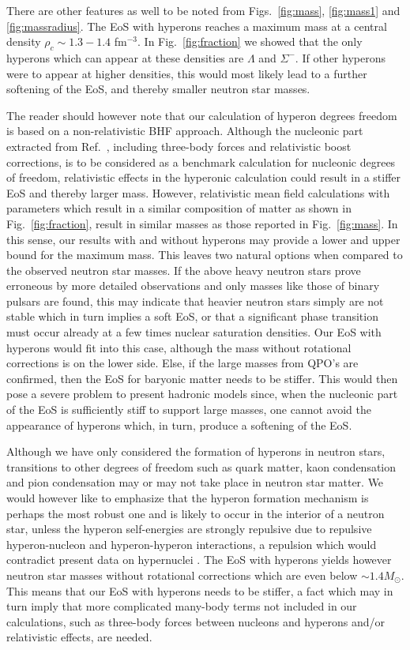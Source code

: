 There are other features as well to be noted from Figs.\ \ref{fig:mass},
\ref{fig:mass1} and \ref{fig:massradius}.
The EoS with hyperons reaches a maximum mass at a central density 
$\rho_c\sim 1.3-1.4$ fm$^{-3}$. In Fig.\ \ref{fig:fraction} 
we showed that the only hyperons which can appear at these densities
are $\Lambda$ and $\Sigma^-$.
If other hyperons were to appear at higher
densities, this would most likely lead to a further softening of the EoS, and 
thereby smaller neutron star masses. 

The reader should however note that our calculation of hyperon
degrees freedom is based on a non-relativistic BHF 
approach. Although the nucleonic part extracted from Ref.\ \cite{apr98},
including three-body forces and relativistic boost corrections, is to be 
considered as a benchmark calculation for nucleonic degrees of freedom,
relativistic effects in the hyperonic calculation could result in a
stiffer EoS and thereby larger mass. However, relativistic mean 
field calculations
with parameters which result in a similar composition of matter as
shown in Fig.\ \ref{fig:fraction}, result in similar masses
as  those reported in Fig.\ \ref{fig:mass}.
In this sense, our results with and without hyperons 
may provide a lower and upper bound for the 
maximum mass. This  leaves two natural options
when compared to the observed neutron star masses.
If the above heavy neutron stars prove erroneous 
by more detailed observations
and only masses like those of binary pulsars are found, 
this may indicate that heavier neutron stars simply are not
stable which in turn implies a soft EoS, or that a
significant phase transition must occur already at a few times nuclear
saturation densities. Our EoS with hyperons would fit into this case, although
the mass without rotational corrections is on the lower side.
Else, if the large masses from QPO's are confirmed, then the EoS
for baryonic matter needs to be stiffer. This would then pose a severe
problem to present hadronic models since, when the nucleonic part of the
EoS is 
sufficiently stiff to support large masses, one cannot avoid the
appearance of hyperons which, in turn, produce a softening of the EoS.

Although we have only considered the formation of hyperons in neutron
stars, transitions to other degrees of freedom such as quark matter,
kaon condensation and pion condensation may or may not take place
in neutron star matter.
We would however like to emphasize that the hyperon formation mechanism
is perhaps the most robust one and is likely to occur in the interior
of a neutron star, unless the hyperon self-energies are strongly repulsive 
due
to repulsive hyperon-nucleon and hyperon-hyperon interactions, a repulsion
which  would contradict
present data on hypernuclei \cite{bando}.
The EoS with hyperons yields however neutron star masses without
rotational corrections which are even below $\sim 1.4M_\odot$.
This means that our EoS with hyperons needs to be stiffer, 
a fact which may in turn
imply that more complicated many-body terms not included in our 
calculations,
such as three-body forces between nucleons and hyperons and/or relativistic
effects,  are needed.

